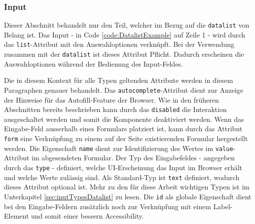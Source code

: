 \subsubsection{\color{dgray} Input}
\label{sec:input}

Dieser Abschnitt behandelt nur den Teil, welcher im Bezug auf die \texttt{datalist} von Belang ist.
Das Input - in Code \ref{code:DatalistExample} auf Zeile 1 - wird durch das \texttt{list}-Attribut mit den Auswahloptionen verknüpft.
Bei der Verwendung zusammen mit der \texttt{datalist} ist dieses Attribut Pflicht.
Dadurch erscheinen die Auswahloptionen während der Bedienung des Input-Feldes. 

Die in diesem Kontext für alle Typen geltenden Attribute werden in diesem Paragraphen genauer behandelt.
Das \texttt{autocomplete}-Attribut dient zur Anzeige der Hinweise für das Autofill-Feature der Browser.
Wie in den früheren Abschnitten bereits beschrieben kann durch das \texttt{disabled} die Interaktion ausgeschaltet werden und somit die Komponente deaktiviert werden.
Wenn das Eingabe-Feld ausserhalb eines Formulars platziert ist, kann durch das Attribut \texttt{form} eine Verknüpfung zu einem auf der Seite existierenden Formular hergestellt werden.
Die Eigenschaft \texttt{name} dient zur Identifizierung des Wertes im \texttt{value}-Attribut im abgesendeten Formular.
Der Typ des Eingabefeldes - angegeben durch das \texttt{type} - definiert, welche UI-Erscheinung das Input im Browser erhält und welche Werte zulässig sind.
Als Standard-Typ ist \texttt{text} definiert, wodurch dieses Attribut optional ist.
Mehr zu den für diese Arbeit wichtigen Typen ist im Unterkapitel \ref{sec:inutTypesDatalist} zu lesen.
Die \texttt{id} als globale Eigenschaft dient bei den Eingabe-Feldern zusätzlich noch zur Verknüpfung mit einem Label-Element und somit einer bessern Accessibility.

